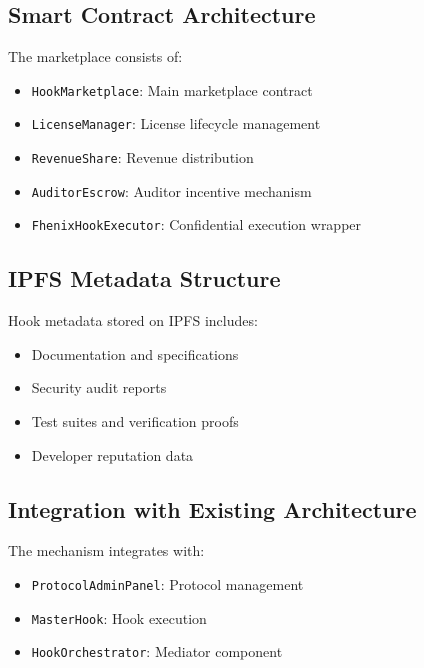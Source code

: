 \documentclass[11pt,a4paper]{article}
\theoremstyle{definition}
\theoremstyle{remark}
\begin{document}
\subsection{Smart Contract Architecture}

The marketplace consists of:
\begin{itemize}
    \item \texttt{HookMarketplace}: Main marketplace contract
    \item \texttt{LicenseManager}: License lifecycle management
    \item \texttt{RevenueShare}: Revenue distribution
    \item \texttt{AuditorEscrow}: Auditor incentive mechanism
    \item \texttt{FhenixHookExecutor}: Confidential execution wrapper
\end{itemize}

\subsection{IPFS Metadata Structure}

Hook metadata stored on IPFS includes:
\begin{itemize}
    \item Documentation and specifications
    \item Security audit reports
    \item Test suites and verification proofs
    \item Developer reputation data
\end{itemize}

\subsection{Integration with Existing Architecture}

The mechanism integrates with:
\begin{itemize}
    \item \texttt{ProtocolAdminPanel}: Protocol management
    \item \texttt{MasterHook}: Hook execution
    \item \texttt{HookOrchestrator}: Mediator component
\end{itemize}

\end{document}
